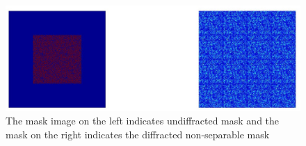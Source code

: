 \begin{figure}[ht]
\centering
\includegraphics[width = \textwidth]{pics/non_sep_diffracted_mask}
\caption{The mask image on the left indicates undiffracted mask and the mask on the right indicates the diffracted non-separable mask}
\label{fig:non_sep_sim_diff}
\end{figure}


